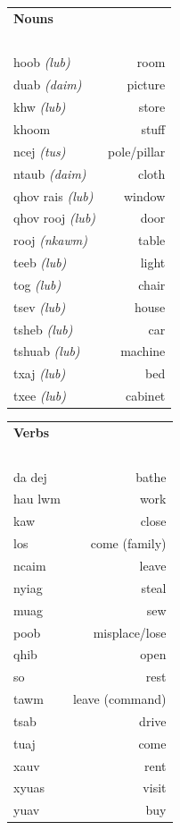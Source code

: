 \documentclass{article}
\begin{document}
\begin{multicols}{2}
[
\section*{}
]

\begin{tabular}{l r}
\textbf{Nouns} \\
~\\
hoob {\em (lub)} &room\\
duab {\em (daim)} &picture\\
khw {\em (lub)} &store\\
khoom &stuff\\
ncej {\em (tus)} &pole/pillar\\
ntaub {\em (daim)} &cloth\\
qhov rais {\em (lub)} &window\\
qhov rooj {\em (lub)} &door\\
rooj {\em (nkawm)} &table\\
teeb {\em (lub)} &light\\
tog {\em (lub)} &chair\\
tsev {\em (lub)} &house\\
tsheb {\em (lub)} &car\\
tshuab {\em (lub)} &machine\\
txaj {\em (lub)} &bed\\
txee {\em (lub)} &cabinet\\
\end{tabular}

\begin{tabular}{l r}
\textbf{Verbs} \\
~\\
da dej &bathe\\
hau lwm &work\\
kaw &close\\
los &come (family)\\
ncaim &leave\\
nyiag &steal\\
muag &sew\\
poob &misplace/lose\\
qhib &open\\
so &rest\\
tawm &leave (command)\\
tsab &drive\\
tuaj &come\\
xauv &rent\\
xyuas &visit\\
yuav &buy\\
\end{tabular}
\end{multicols}
\end{document}

